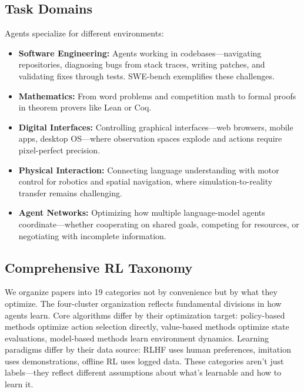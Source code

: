 \documentclass[12pt,a4paper]{report}
\theoremstyle{definition}
\begin{document}
\subsection{Task Domains}
Agents specialize for different environments:
\begin{itemize}
    \item \textbf{Software Engineering:} Agents working in codebases---navigating repositories, diagnosing bugs from stack traces, writing patches, and validating fixes through tests. SWE-bench exemplifies these challenges.
    \item \textbf{Mathematics:} From word problems and competition math to formal proofs in theorem provers like Lean or Coq.
    \item \textbf{Digital Interfaces:} Controlling graphical interfaces---web browsers, mobile apps, desktop OS---where observation spaces explode and actions require pixel-perfect precision.
    \item \textbf{Physical Interaction:} Connecting language understanding with motor control for robotics and spatial navigation, where simulation-to-reality transfer remains challenging.
    \item \textbf{Agent Networks:} Optimizing how multiple language-model agents coordinate---whether cooperating on shared goals, competing for resources, or negotiating with incomplete information.
\end{itemize}

\subsection{Comprehensive RL Taxonomy}
We organize papers into 19 categories not by convenience but by what they optimize. The four-cluster organization reflects fundamental divisions in how agents learn. Core algorithms differ by their optimization target: policy-based methods optimize action selection directly, value-based methods optimize state evaluations, model-based methods learn environment dynamics. Learning paradigms differ by their data source: RLHF uses human preferences, imitation uses demonstrations, offline RL uses logged data. These categories aren't just labels—they reflect different assumptions about what's learnable and how to learn it.
\end{document}

